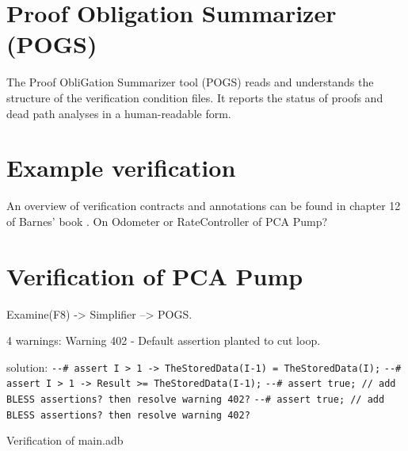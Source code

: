 \section{Proof Obligation Summarizer (POGS)}
\label{verification:pogs}

The Proof ObliGation Summarizer tool (POGS) reads and understands the structure of the verification condition files. It reports the status of proofs and dead path analyses in a human-readable form. \cite{POGS:Online}


\section{Example verification}
\label{verification:example}

An overview of verification contracts and annotations can be found in chapter 12 of Barnes' book \cite{Barnes:Book}.
On Odometer or RateController of PCA Pump?

\section{Verification of PCA Pump}
\label{verification:pcapump}

Examine(F8) -> Simplifier --> POGS.

4 warnings:
Warning 402 - Default assertion planted to cut loop.

solution:
\lstinline{--# assert I > 1 -> TheStoredData(I-1) = TheStoredData(I);}
\lstinline{--# assert I > 1 -> Result >= TheStoredData(I-1);}
\lstinline{--# assert true; // add BLESS assertions? then resolve warning 402?}
\lstinline{--# assert true; // add BLESS assertions? then resolve warning 402?}


Verification of main.adb

